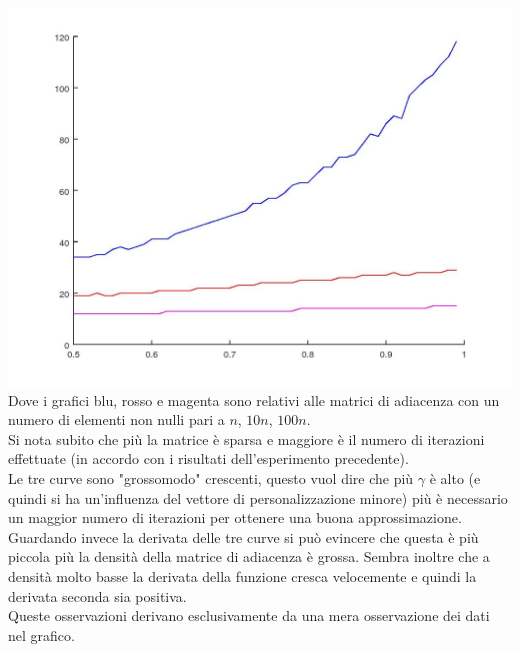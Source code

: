 \documentclass{article}
\begin{document}
	\includegraphics[width=\textwidth]{grafico_es3o.jpeg}
	Dove i grafici blu, rosso e magenta sono relativi alle matrici di adiacenza con un numero di elementi non nulli pari a $n$, $10n$, $100n$.\\
	Si nota subito che più la matrice è sparsa e maggiore è il numero di iterazioni effettuate (in accordo con i risultati dell'esperimento precedente).\\
	Le tre curve sono "grossomodo" crescenti, questo vuol dire che più $\gamma$ è alto (e quindi si ha un'influenza del vettore di personalizzazione minore) più è necessario un maggior numero di iterazioni per ottenere una buona approssimazione.\\
	Guardando invece la derivata delle tre curve si può evincere che questa è più piccola più la densità della matrice di adiacenza è grossa. Sembra inoltre che a densità molto basse la derivata della funzione cresca velocemente e quindi la derivata seconda sia positiva.\\
	Queste osservazioni derivano esclusivamente da una mera osservazione dei dati nel grafico.
\end{document}
